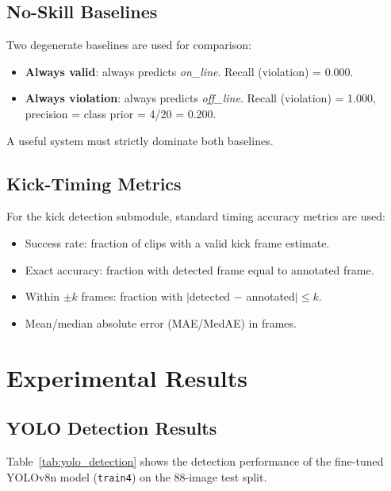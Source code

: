 \documentclass[12pt,a4paper,twoside]{article}
\begin{document}
\subsection{No-Skill Baselines}

Two degenerate baselines are used for comparison:
\begin{itemize}
  \item \textbf{Always valid}: always predicts \textit{on\_line}.
        Recall (violation) = 0.000.
  \item \textbf{Always violation}: always predicts \textit{off\_line}.
        Recall (violation) = 1.000, precision = class prior = 4/20 = 0.200.
\end{itemize}

A useful system must strictly dominate both baselines.

\subsection{Kick-Timing Metrics}

For the kick detection submodule, standard timing accuracy metrics are used:
\begin{itemize}
  \item Success rate: fraction of clips with a valid kick frame estimate.
  \item Exact accuracy: fraction with detected frame equal to annotated frame.
  \item Within $\pm k$ frames: fraction with $|$detected $-$ annotated$| \leq k$.
  \item Mean/median absolute error (MAE/MedAE) in frames.
\end{itemize}


\section{Experimental Results}
\label{sec:results}

\subsection{YOLO Detection Results}

Table~\ref{tab:yolo_detection} shows the detection performance of the
fine-tuned YOLOv8n model (\texttt{train4}) on the 88-image test split.
\end{document}

